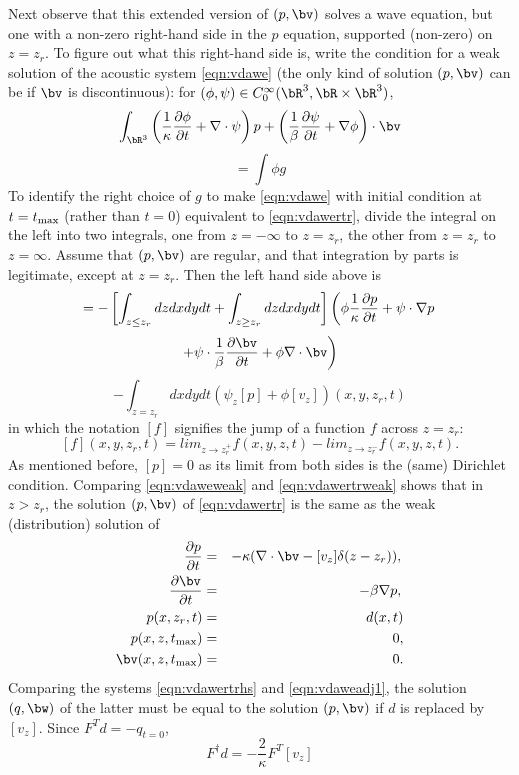 Next observe that this extended version of $(p,\bv)$ solves a wave equation, but one with a non-zero right-hand side in the $p$ equation, supported (non-zero) on $z=z_r$. To figure out what this right-hand side is, write the condition for a weak solution of the acoustic system \ref{eqn:vdawe} (the only kind of solution $(p,\bv)$ can be if $\bv$ is discontinuous): for $(\phi,{\bf \psi}) \in C^{\infty}_0(\bR^3,\bR \times \bR^3)$, 
\[
\int_{\bR^3} \left(\frac{1}{\kappa}\frac{\partial \phi}{\partial t}+\nabla \cdot {\bf \psi}\right)p +\left(\frac{1}{\beta}\frac{\partial {\bf \psi}}{\partial t} + \nabla \phi\right)\cdot \bv
\]
\begin{equation}
\label{eqn:vdaweweak}
= \int \phi g
\end{equation}
To identify the right choice of $g$ to make \ref{eqn:vdawe} with initial condition at $t = t_{\rm max}$ (rather than $t=0$) equivalent to \ref{eqn:vdawertr}, divide the integral on the left into two integrals, one from $z=-{\infty}$ to $z=z_r$, the other from $z=z_r$ to $z=\infty$. Assume that $(p,\bv)$ are regular, and that integration by parts is legitimate, except at $z=z_r$. Then the left hand side above is
\[
= -\left[\int_{z\le z_r} dz dx dy dt + \int_{z\ge z_r} dz dx dy dt\right]\left(\phi\frac{1}{\kappa}\frac{\partial p}{\partial t}+{\bf \psi} \cdot\nabla p\right.
\]
\[
\left. + {\bf \psi} \cdot\frac{1}{\beta}\frac{\partial \bv} {\partial t} + \phi \nabla \cdot \bv\right)
\]
\begin{equation}
\label{eqn:vdawertrweak}
- \int_{z=z_r}dx dy dt (\psi_z [p] + \phi [v_z])(x,y,z_r,t)
\end{equation}
in which the notation $[f]$ signifies the jump of a function $f$ across $z=z_r$:
\[
[f](x,y,z_r,t) = lim_{z\rightarrow z_r^+}f(x,y,z,t) - lim_{z\rightarrow z_r^-}f(x,y,z,t).
\]
As mentioned before, $[p]=0$ as its limit from both sides is the (same) Dirichlet condition. Comparing \ref{eqn:vdaweweak} and \ref{eqn:vdawertrweak} shows that in $z>z_r$, the solution $(p,\bv)$ of \ref{eqn:vdawertr} is the same as the weak (distribution) solution of 
\begin{eqnarray}
\label{eqn:vdawertrhs}
\frac{\partial p}{\partial t}&=& -\kappa (\nabla \cdot \bv -  [v_z]\delta(z-z_r)) , \, \nonumber \\
\frac{\partial \bv}{\partial t} &=& -\beta \nabla p, \, \nonumber \\
p(x,z_r,t) & = & d(x,t) \nonumber \\
p(x,z,t_{\rm max}) & = & 0,  \nonumber \\
\bv(x,z,t_{\rm max}) & = & 0.
\end{eqnarray}
Comparing the systems \ref{eqn:vdawertrhs} and \ref{eqn:vdaweadj1}, the solution $(q,\bw)$ of the latter must be equal to the solution $(p,\bv)$ if $d$ is replaced by $[v_z]$. Since $F^Td = -q_{t=0}$, 
\begin{equation}
\label{eqn:pseudoadj}
F^{\dagger}d = -\frac{2}{\kappa}F^T[v_z]
\end{equation}

